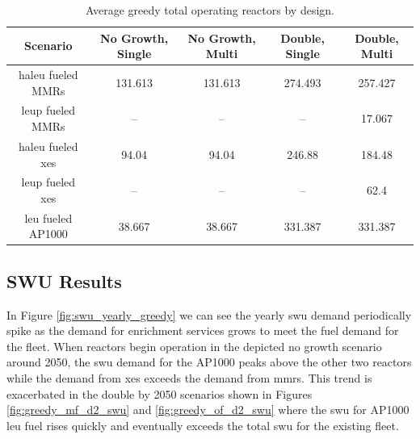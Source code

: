 \begin{table}[H]
  \centering
  \caption{Average greedy total operating reactors by design.}
  \label{tab:greedy_reac_avg}
  \begin{tabular}{c c c c c}
     \hline
     Scenario & No Growth, Single & No Growth, Multi & Double, Single & Double, Multi  \\
     \hline
     \gls{haleu} fueled MMRs      & 131.613 & 131.613 & 274.493 & 257.427 \\
     \gls{leup} fueled MMRs       & --      & --      & --      & 17.067 \\
     \gls{haleu} fueled \gls{xe}s & 94.04   & 94.04   & 246.88  & 184.48 \\
     \gls{leup} fueled \gls{xe}s  & --      & --      & --      & 62.4 \\
     \gls{leu} fueled AP1000      & 38.667  & 38.667  & 331.387 & 331.387 \\
     \hline
  \end{tabular}
\end{table}




\subsection{SWU Results}
\label{sec:greedy_swu}

In Figure \ref{fig:swu_yearly_greedy} we can see the yearly \gls{swu} demand
periodically spike as the demand for enrichment services grows to meet the fuel
demand for the fleet. When reactors begin operation in the depicted no growth
scenario around 2050, the \gls{swu} demand for the AP1000 peaks above the other
two reactors while the demand from \glspl{xe} exceeds the demand from
\glspl{mmr}. This trend is exacerbated in the double by 2050 scenarios shown in
Figures \ref{fig:greedy_mf_d2_swu} and \ref{fig:greedy_of_d2_swu} where the
\gls{swu} for AP1000 \gls{leu} fuel rises quickly and eventually exceeds the
total \gls{swu} for the existing fleet.



